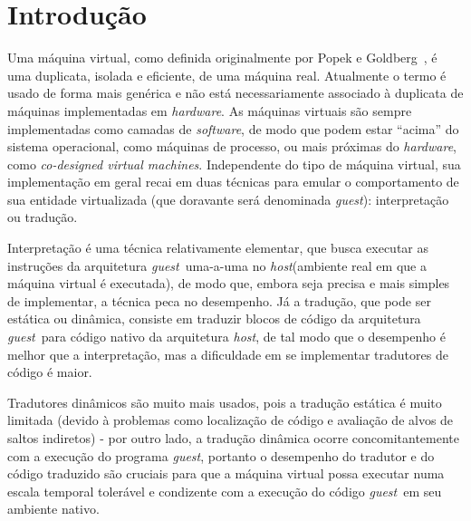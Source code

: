 \documentclass[11pt,twoside]{article}
\newcommand{\guest}{\emph{guest}}
\newcommand{\host}{\emph{host}}
\newcommand{\qq}[1]{``#1''}
\begin{document}
\section{Introdução}
Uma máquina virtual, como definida originalmente por Popek e Goldberg~\cite{PG74}, é uma duplicata, isolada e eficiente, de uma máquina real. Atualmente o termo é usado de forma mais genérica e não está necessariamente associado à duplicata de máquinas implementadas em \emph{hardware}.  As máquinas virtuais são sempre implementadas como camadas de \emph{software}, de modo que podem estar \qq{acima} do sistema operacional, como máquinas de processo, ou mais próximas do \emph{hardware}, como \emph{co-designed virtual machines}. Independente do tipo de máquina virtual, sua implementação em geral recai em duas técnicas para emular o comportamento de sua entidade virtualizada (que doravante será denominada \guest): interpretação ou tradução. 

Interpretação é uma técnica relativamente elementar, que busca executar as instruções da arquitetura \guest~uma-a-uma no \host (ambiente real em que a máquina virtual é executada), de modo que, embora seja precisa e mais simples de implementar, a técnica peca no desempenho. Já a tradução, que pode ser estática ou dinâmica, consiste em traduzir blocos de código da arquitetura \guest~para código nativo da arquitetura \host, de tal modo que o desempenho é melhor que a interpretação, mas a dificuldade em se implementar tradutores de código é maior.

Tradutores dinâmicos são muito mais usados, pois a tradução estática é muito limitada (devido à problemas como localização de código e avaliação de alvos de saltos indiretos) - por outro lado, a tradução dinâmica ocorre concomitantemente com a execução do programa \guest, portanto o desempenho do tradutor e do código traduzido são cruciais para que a máquina virtual possa executar numa escala temporal tolerável e condizente com a execução do código \guest~em seu ambiente nativo.
\end{document}
